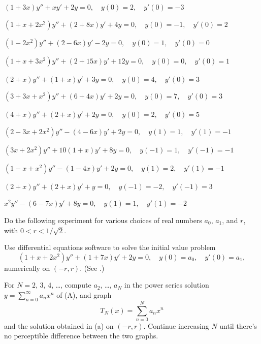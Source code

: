 \begin{exerciselist}

\item\label{exer:7.3.1}\Cex
$(1+3x)y''+xy'+2y=0,\quad y(0)=2,\quad y'(0)=-3$

\item\label{exer:7.3.2}\Cex
$(1+x+2x^2)y''+(2+8x)y'+4y=0,\quad y(0)=-1,\quad y'(0)=2$


\item\label{exer:7.3.3}\Cex
$(1-2x^2)y''+(2-6x)y'-2y=0,\quad y(0)=1,\quad y'(0)=0$

\item\label{exer:7.3.4}\Cex
$(1+x+3x^2)y''+(2+15x)y'+12y=0,\quad y(0)=0,\quad y'(0)=1$


\item\label{exer:7.3.5}\Cex
$(2+x)y''+(1+x)y'+3y=0,\quad y(0)=4,\quad y'(0)=3$

\item\label{exer:7.3.6}\Cex
$(3+3x+x^2)y''+(6+4x)y'+2y=0,\quad y(0)=7,\quad y'(0)=3$

\item\label{exer:7.3.7}\Cex
$(4+x)y''+(2+x)y'+2y=0,\quad y(0)=2,\quad y'(0)=5$

\item\label{exer:7.3.8}\Cex
$(2-3x+2x^2)y''-(4-6x)y'+2y=0,\quad y(1)=1,\quad y'(1)=-1$

\item\label{exer:7.3.9}\Cex
$(3x+2x^2)y''+10(1+x)y'+8y=0,\quad y(-1)=1,\quad y'(-1)=-1$

\item\label{exer:7.3.10}\Cex
$(1-x+x^2)y''-(1-4x)y'+2y=0,\quad y(1)=2,\quad y'(1)=-1$

\item\label{exer:7.3.11}\Cex
$(2+x)y''+(2+x)y'+y=0,\quad y(-1)=-2,\quad y'(-1)=3$

\item\label{exer:7.3.12}\Cex
$x^2y''-(6-7x)y'+8y=0,\quad y(1)=1,\quad y'(1)=-2$


\item\label{exer:7.3.13}\Lex
Do the following experiment for various choices of
real numbers  $a_0$, $a_1$, and $r$, with $0<r<1/\sqrt2$.
\begin{alist}
\item %
Use  differential equations software  to solve the initial
value problem
\[
(1+x+2x^2)y''+(1+7x)y'+2y=0,\quad y(0)=a_0,\quad y'(0)=a_1,\tag{A}
\]
numerically on $(-r,r)$. (See .)
\item %
For $N=2$, $3$, $4$, \dots, compute $a_2$, \dots, $a_N$ in the power series
solution
$y=\sum_{n=0}^\infty a_nx^n$ of (A), and graph
\[
T_N(x)=\sum_{n=0}^N a_nx^n
\]
and the solution obtained in (a) on $(-r,r)$.
Continue increasing $N$ until there's no perceptible
difference between the two graphs.
\end{alist}



\end{exerciselist}

